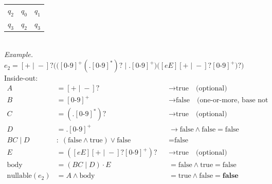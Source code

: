 \documentclass[9pt, a4paper]{extarticle}
\begin{document}
\begin{minipage}[t]{0.495\textwidth}
\begin{minipage}[t]{0.495\textwidth}
\begin{center}
\begin{tabular}{c|cc}
$q_2$               & $q_0$ & $q_1$ \\
$q_3$               & $q_2$ & $q_3$ \\
\bottomrule
\end{tabular}
\end{center}
\end{minipage}\\
\textit{Example.}\; $e_2 = [+\!\mid\!-]?\Big(\big([0\text{-}9]^+(.[0\text{-}9]^*)?\;\big|\;.[0\text{-}9]^+\big)\big([eE][+\!\mid\!-]?[0\text{-}9]^+\big)?\Big)$\\[4pt]
Inside-out:
\[
\begin{aligned}
A &= [+\!\mid\!-]? &&\to \text{true} \quad\text{(optional)}\\
B &= [0\text{-}9]^+ &&\to \text{false} \quad\text{(one-or-more, base not nullable)}\\
C &= (.[0\text{-}9]^*)? &&\to \text{true} \quad\text{(optional)}\\
D &= .[0\text{-}9]^+ &&\to \text{false} \land \text{false} = \text{false}\\
BC\mid D &: \;(\text{false}\land\text{true})\lor\text{false} &&= \text{false}\\
E &= ([eE][+\!\mid\!-]?[0\text{-}9]^+)? &&\to \text{true} \quad\text{(optional)}\\
\text{body} &= (BC\mid D)\cdot E &&= \text{false}\land\text{true} = \text{false}\\[2pt]
\text{nullable}(e_2) &= A \land \text{body} &&= \text{true}\land\text{false} = \boxed{\textbf{false}}
\end{aligned}
\]
\end{minipage}
\end{document}
